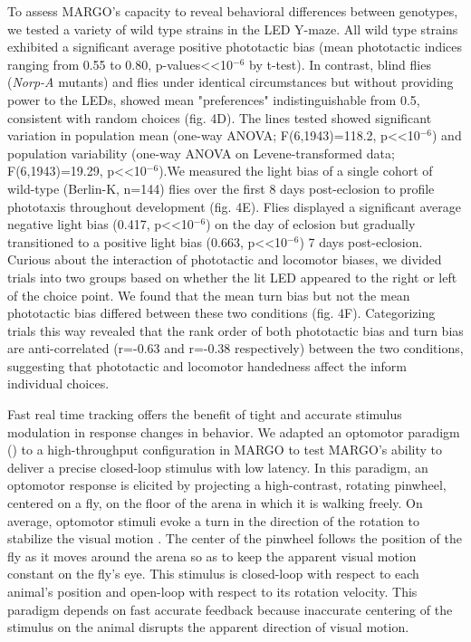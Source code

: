 \documentclass[10pt]{article}
\begin{document}
\begin{multicols}{2}
To assess MARGO's capacity to reveal behavioral differences between genotypes, we tested a variety of wild type strains in the LED Y-maze. All wild type strains exhibited a significant average positive phototactic bias (mean phototactic indices ranging from 0.55 to 0.80, p-values<<10$^{-6}$ by t-test). In contrast, blind flies (\emph{Norp-A} mutants) and flies under identical circumstances but without providing power to the LEDs, showed mean "preferences" indistinguishable from 0.5, consistent with random choices (fig. 4D). The lines tested showed significant variation in population mean (one-way ANOVA; F(6,1943)=118.2, p<<10$^{-6}$) and population variability (one-way ANOVA on Levene-transformed data; F(6,1943)=19.29, p<<10$^{-6}$).We measured the light bias of a single cohort of wild-type (Berlin-K, n=144) flies over the first 8 days post-eclosion to profile phototaxis throughout development (fig. 4E). Flies displayed a significant average negative light bias (0.417, p<<10$^{-6}$) on the day of eclosion but gradually transitioned to a positive light bias (0.663, p<<10$^{-6}$) 7 days post-eclosion. Curious about the interaction of phototactic and locomotor biases, we divided trials into two groups based on whether the lit LED appeared to the right or left of the choice point. We found that the mean turn bias but not the mean phototactic bias differed between these two conditions (fig. 4F). Categorizing trials this way revealed that the rank order of both phototactic bias and turn bias are anti-correlated (r=-0.63 and r=-0.38 respectively) between the two conditions, suggesting that phototactic and locomotor handedness affect the inform individual choices. 

Fast real time tracking offers the benefit of tight and accurate stimulus modulation in response changes in behavior. We adapted an optomotor paradigm (\cite{Cruz572792})  to a high-throughput configuration in MARGO to test MARGO's ability to deliver a precise closed-loop stimulus with low latency. In this paradigm, an optomotor response is elicited by projecting a high-contrast, rotating pinwheel, centered on a fly, on the floor of the arena in which it is walking freely. On average, optomotor stimuli evoke a turn in the direction of the rotation to stabilize the visual motion \cite{Gtz_Visual_1973}. The center of the pinwheel follows the position of the fly as it moves around the arena so as to keep the apparent visual motion constant on the fly's eye. This stimulus is closed-loop with respect to each animal's position and open-loop with respect to its rotation velocity. This paradigm depends on fast accurate feedback because inaccurate centering of the stimulus on the animal disrupts the apparent direction of visual motion.


\end{multicols}
\end{document}
